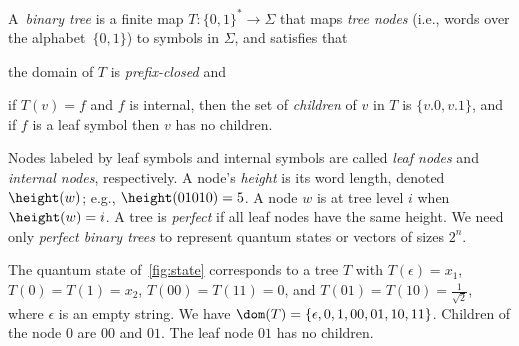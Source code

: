 A~\emph{binary tree} is a finite map $T\colon \{0,1\}^*\rightarrow \Sigma$ that maps \emph{tree nodes} (i.e., words over the alphabet~$\{0,1\}$) to symbols in $\Sigma$, and satisfies that
%
\begin{inparaenum}
    \item the domain of $T$ is \emph{prefix-closed} and
    \item if $T(v) = f$ and $f$ is internal, then the set of \emph{children} of $v$ in $T$ is $\{v.0,v.1\}$, and if $f$ is a leaf symbol then $v$ has no children.
\end{inparaenum}
Nodes labeled by leaf symbols and internal symbols are called \emph{leaf nodes} and \emph{internal nodes}, respectively. 
A node's \emph{height} is its word length, denoted~$\height(w)$; e.g., $\height(01010) = 5$.
A node $w$ is at tree level $i$ when $\height(w)=i$. A tree is \emph{perfect} if all leaf nodes have the same height. We need only \emph{perfect binary trees} to represent quantum states or vectors of sizes $2^n$.
\begin{example}
The quantum state of~\cref{fig:state} corresponds to a tree $T$ with
  $T(\epsilon)=x_1$, $T(0)=T(1)=x_2$, $T(00)=T(11)=0$, and
  $T(01)=T(10)=\frac{1}{\sqrt{2}}$, where $\epsilon$ is an empty string. We have
  $\dom(T)=\{\epsilon, 0,1,00,01,10,11\}$. Children of the node $0$ are $00$ and $01$.
  The leaf node $01$ has no children.
\end{example}


